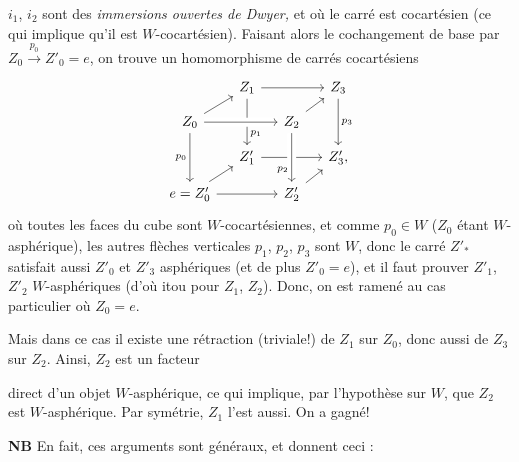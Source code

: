 \documentclass[11pt]{article}
\newcommand{\msp}[1]{\marginpar{\footnotesize [#1]}}
\begin{document}
$i_1$, $i_2$ sont des \textit{immersions ouvertes de Dwyer,} et où le carré est cocartésien (ce qui implique qu'il est $W$-cocartésien). Faisant alors le cochangement de base par $Z_0 \xrightarrow{p_0} Z'_0 = e$, on trouve un homomorphisme de carrés cocartésiens
\[
\begin{tikzcd}[ampersand replacement=\&, column sep=small, row sep=small]
 \& Z_1 \arrow[rr] \arrow[dd, "p_1" near end] \& \& Z_3 \arrow[dd, "p_3"] \\
Z_0 \arrow[ur] \arrow[rr, crossing over] \arrow[dd, "p_0"'] \& \& Z_2 \arrow[ur] \& \\
 \& Z'_1 \arrow[rr] \& \& Z'_3, \\
e = Z'_0 \arrow[ur] \arrow[rr] \& \& Z'_2 \arrow[ur] \arrow[from=uu, crossing over, "p_2"' near end] \&
\end{tikzcd}
\]
où toutes les faces du cube sont $W$-cocartésiennes, et comme $p_0 \in W$ ($Z_0$ étant $W$-asphérique), les autres flèches verticales $p_1$, $p_2$, $p_3$ sont $W$, donc le carré $Z'_*$ satisfait aussi $Z'_0$ et $Z'_3$ asphériques (et de plus $Z'_0 = e$), et il faut prouver $Z'_1$, $Z'_2$ $W$-asphériques (d'où itou pour $Z_1$, $Z_2$). Donc, on est ramené au cas particulier où $Z_0 = e$.

Mais dans ce cas il existe une rétraction (triviale!) de $Z_1$ sur $Z_0$, donc aussi de $Z_3$ sur $Z_2$. Ainsi, $Z_2$ est un facteur

\msp{page 272}

direct d'un objet $W$-asphérique, ce qui implique, par l'hypothèse sur $W$, que $Z_2$ est $W$-asphérique. Par symétrie, $Z_1$ l'est aussi. On a gagné!

\textbf{NB} En fait, ces arguments sont généraux, et donnent ceci :
\end{document}
